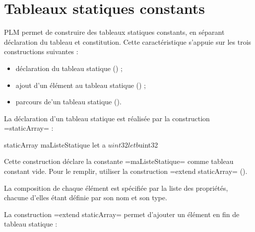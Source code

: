




\chapter{Tableaux statiques constants}

PLM permet de construire des tableaux statiques constants, en séparant déclaration du tableau et constitution. Cette caractéristique s'appuie sur les trois constructions suivantes :
\begin{itemize}
  \item déclaration du tableau statique () ;
  \item ajout d'un élément au tableau statique () ;
  \item parcours de'un tableau statique ().
\end{itemize}












La déclaration d'un tableau statique est réalisée par la construction \plm=staticArray= :

\begin{PLM}
staticArray maListeStatique {
  let a $uint32
  let b $uint32
}
\end{PLM}

Cette construction déclare la constante \plm=maListeStatique= comme tableau constant vide. Pour le remplir, utiliser la construction \plm=extend staticArray= ().

La composition de chaque élément est spécifiée par la liste des propriétés, chacune d'elles étant définie par son nom et son type.










La construction \plm=extend staticArray= permet d'ajouter un élément en fin de tableau statique :

